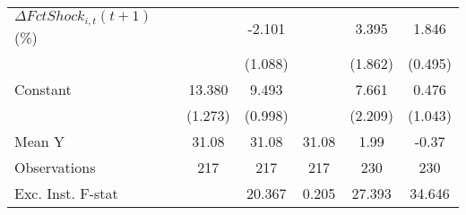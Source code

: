 {\begin{tabular}{l*{5}{c}}
\addlinespace
$ \Delta FctShock_{i,t}(t+1)$ (\%)&                     &      -2.101\sym{*}  &                     &       3.395\sym{*}  &       1.846\sym{***}\\
                    &                     &     (1.088)         &                     &     (1.862)         &     (0.495)         \\
\addlinespace
Constant            &      13.380\sym{***}&       9.493\sym{***}&                     &       7.661\sym{***}&       0.476         \\
                    &     (1.273)         &     (0.998)         &                     &     (2.209)         &     (1.043)         \\
\midrule
Mean Y              &       31.08         &       31.08         &       31.08         &        1.99         &       -0.37         \\
Observations        &         217         &         217         &         217         &         230         &         230         \\
Exc. Inst. F-stat   &                     &      20.367         &       0.205         &      27.393         &      34.646         \\
\bottomrule
\end{tabular}
}
